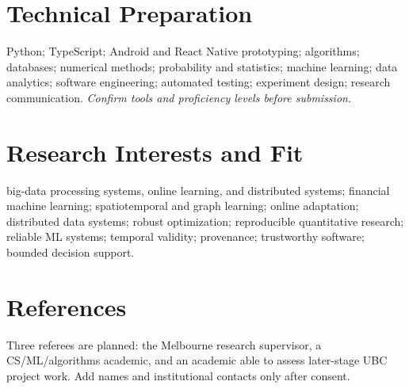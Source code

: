 \documentclass[11pt]{article}
\begin{document}
\section*{Technical Preparation}
Python; TypeScript; Android and React Native prototyping; algorithms; databases; numerical methods; probability and statistics; machine learning; data analytics; software engineering; automated testing; experiment design; research communication. \textit{Confirm tools and proficiency levels before submission.}

\section*{Research Interests and Fit}
big-data processing systems, online learning, and distributed systems; financial machine learning; spatiotemporal and graph learning; online adaptation; distributed data systems; robust optimization; reproducible quantitative research; reliable ML systems; temporal validity; provenance; trustworthy software; bounded decision support.

\section*{References}
Three referees are planned: the Melbourne research supervisor, a CS/ML/algorithms academic, and an academic able to assess later-stage UBC project work. Add names and institutional contacts only after consent.
\end{document}
